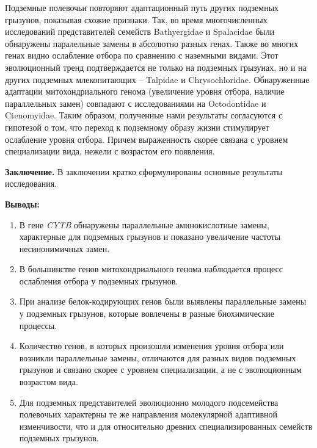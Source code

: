 Подземные полевочьи повторяют адаптационный путь других подземных грызунов, показывая схожие признаки. Так, во время многочисленных исследований представителей семейств Bathyergidae и  Spalacidae были обнаружены паралельные замены в абсолютно разных генах. Также во многих генах видно ослабление отбора по сравнению с наземными видами. Этот эволюционный тренд подтверждается не только на подземных грызунах, но и на других подземных млекопитающих --  Talpidae и Chrysochloridae. Обнаруженные адаптации митохондриального генома (увеличение уровня отбора, наличие параллельных замен) совпадают с исследованиями на Octodontidae и Ctenomyidae. Таким образом, полученные нами результаты согласуются с гипотезой о том, что переход к подземному образу жизни стимулирует ослабление уровня отбора. Причем выраженность скорее связана с уровнем специализации вида, нежели с возрастом его появления.

\vspace{3mm}

\hspace{-10mm}\textbf{\large Заключение.}
В заключении кратко сформулированы основные результаты исследования.

\vspace{3mm}

\hspace{-10mm}\textbf{\large Выводы:}

\begin{enumerate}
	
\item В гене \textit{CYTB} обнаружены параллельные аминокислотные замены, характерные для подземных грызунов и показано увеличение частоты несинонимичных замен.

\item В большинстве генов митохондриального генома наблюдается процесс ослабления отбора у подземных грызунов. 

\item При анализе белок-кодирующих генов были выявлены параллельные замены у подземных грызунов, которые вовлечены в разные биохимические процессы. 

\item Количество генов, в которых произошли изменения уровня отбора или возникли параллельные замены, отличаются для разных видов подземных грызунов и связано скорее с уровнем специализации, а не с эволюционным возрастом вида. 

\item Для подземных представителей эволюционно молодого подсемейства полевочьих характерны те же направления молекулярной адаптивной изменчивости, что и для относительно древних специализированных семейств подземных грызунов.
	
\end{enumerate}


